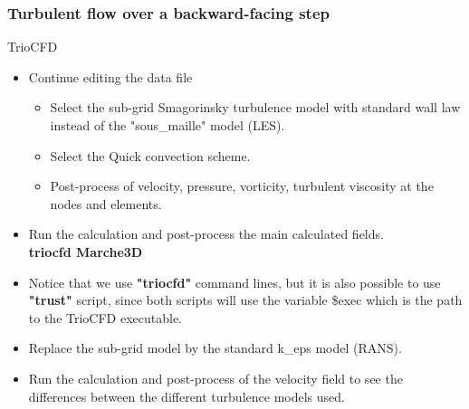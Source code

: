 \documentclass[10pt, hyperref={unicode=true,pdfusetitle, bookmarks=true,bookmarksnumbered=false,bookmarksopen=false, breaklinks=false,pdfborder={0 0l 1},backref=true,colorlinks=true,linkcolor=darkblue,pageanchor}]{beamer}
\begin{document}
\begin{frame}
\frametitle{Turbulent flow over a backward-facing step}
\begin{block}{TrioCFD}

\begin{itemize}
\item Continue editing the data file
    \begin{itemize}
    \item [$\circ$] Select the sub-grid Smagorinsky turbulence model with standard wall law instead of the "sous\_maille" model (LES).
    \item [$\circ$] Select the Quick convection scheme.
    \item [$\circ$] Post-process of velocity, pressure, vorticity, turbulent viscosity at the nodes and elements.
    \end{itemize}
    
\item Run the calculation and post-process the main calculated fields.\\
\textbf{triocfd Marche3D} \\

\item Notice that we use \textbf{"triocfd"} command lines, but it is also possible to use \textbf{"trust"} script, since both scripts will use the variable \$exec which is the path to the TrioCFD executable.

\item Replace the sub-grid model by the standard k\_eps model (RANS).
\item Run the calculation and post-process of the velocity field to see the differences between the different turbulence models used.
\end{itemize}

\end{block}
\end{frame}
\end{document}
